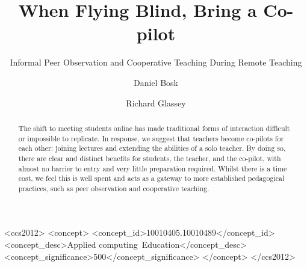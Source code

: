 \documentclass[sigconf,natbib=false]{acmart}
\begin{document}
\title{When Flying Blind, Bring a Co-pilot}
\subtitle{Informal Peer Observation and Cooperative Teaching During Remote Teaching}


\author{Daniel Bosk}
\orcid{}

\author{Richard Glassey}
\orcid{}
\fancyhead{}


\begin{abstract}

The shift to meeting students online has made traditional forms of interaction 
difficult or impossible to replicate. In response, we suggest that teachers 
become co-pilots for each other: joining lectures and extending the abilities 
of a solo teacher. By doing so, there are clear and distinct benefits for 
students, the teacher, and the co-pilot, with almost no barrier to entry and 
very little preparation required. Whilst there is a time cost, we feel this is 
well spent and acts as a gateway to more established pedagogical practices, 
such as peer observation and cooperative teaching.

\end{abstract}

\begin{CCSXML}
<ccs2012>
<concept>
<concept_id>10010405.10010489</concept_id>
<concept_desc>Applied computing~Education</concept_desc>
<concept_significance>500</concept_significance>
</concept>
</ccs2012>
\end{CCSXML}
\end{document}
